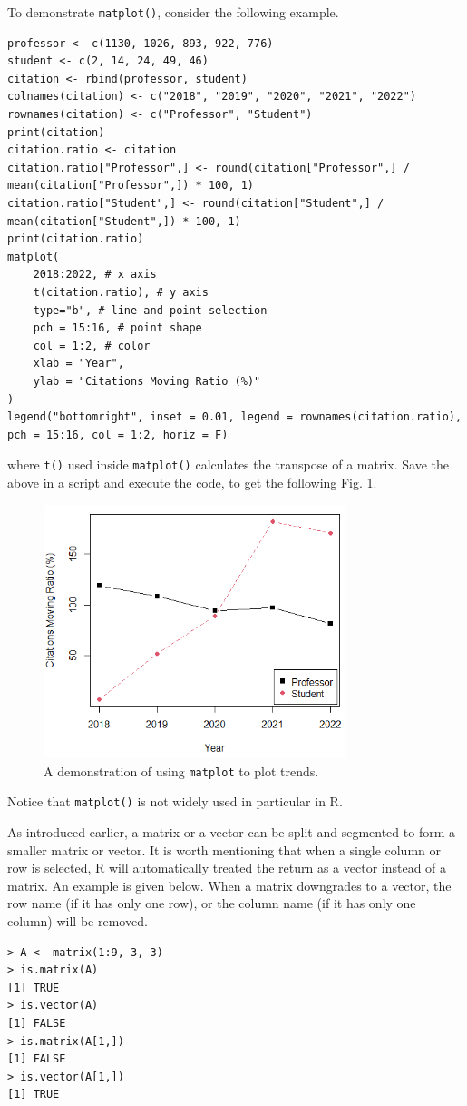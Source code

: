 To demonstrate \verb|matplot()|, consider the following example.
\begin{lstlisting}
professor <- c(1130, 1026, 893, 922, 776)
student <- c(2, 14, 24, 49, 46)
citation <- rbind(professor, student)
colnames(citation) <- c("2018", "2019", "2020", "2021", "2022")
rownames(citation) <- c("Professor", "Student")
print(citation)
citation.ratio <- citation
citation.ratio["Professor",] <- round(citation["Professor",] / mean(citation["Professor",]) * 100, 1)
citation.ratio["Student",] <- round(citation["Student",] / mean(citation["Student",]) * 100, 1)
print(citation.ratio)
matplot(
	2018:2022, # x axis
	t(citation.ratio), # y axis
	type="b", # line and point selection
	pch = 15:16, # point shape
	col = 1:2, # color
	xlab = "Year",
	ylab = "Citations Moving Ratio (%)"
)
legend("bottomright", inset = 0.01, legend = rownames(citation.ratio), pch = 15:16, col = 1:2, horiz = F)
\end{lstlisting}
where \verb|t()| used inside \verb|matplot()| calculates the transpose of a matrix. Save the above in a script and execute the code, to get the following Fig. \ref{ch:r1:fig:matplot_demo}.
\begin{figure}
	\centering
	\includegraphics[width=250pt]{chapters/ch-r/figures/matplot_demo.png}
	\caption{A demonstration of using \texttt{matplot} to plot trends.} \label{ch:r1:fig:matplot_demo}
\end{figure}

Notice that \verb|matplot()| is not widely used in particular in R.

As introduced earlier, a matrix or a vector can be split and segmented to form a smaller matrix or vector. It is worth mentioning that when a single column or row is selected, R will automatically treated the return as a vector instead of a matrix. An example is given below. When a matrix downgrades to a vector, the row name (if it has only one row), or the column name (if it has only one column) will be removed.
\begin{lstlisting}
> A <- matrix(1:9, 3, 3)
> is.matrix(A)
[1] TRUE
> is.vector(A)
[1] FALSE
> is.matrix(A[1,])
[1] FALSE
> is.vector(A[1,])
[1] TRUE
\end{lstlisting}

